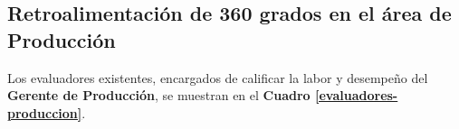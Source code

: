 \begin{table}[h]
    \centering
    \caption{Tabla de evaluación de retroalimentación de 360 grados.}
    \label{evaluacion-retroalimentacion}
\end{table}


\subsection{Retroalimentación de 360 grados en el área de Producción}

Los evaluadores existentes, encargados de calificar la labor y desempeño del \textbf{Gerente de Producción}, se muestran en el \textbf{Cuadro \ref{evaluadores-produccion}}.


